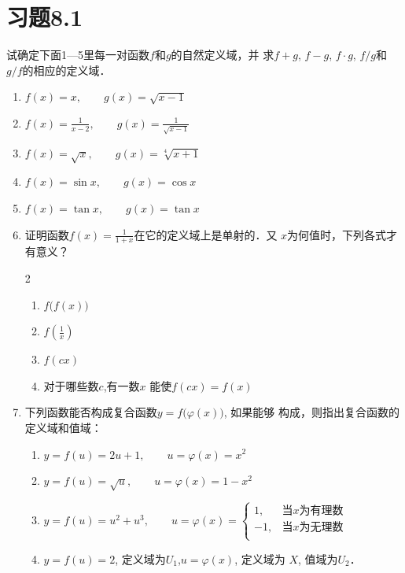 \section*{习题8.1}

试确定下面1---5里每一对函数$f$和$g$的自然定义域，并
求$f+g$, $f-g$, $f\cdot g$, $f/g$和$g/f$的相应的定义域．

\begin{enumerate}
    \item $f(x)=x,\qquad g(x)=\sqrt{x-1}$
    \item $f(x)=\frac{1}{x-2},\qquad g(x)=\frac{1}{\sqrt{x-1}}$
        \item $f(x)=\sqrt{x},\qquad g(x)=\sqrt[4]{x+1}$
    \item $f(x)=\sin x,\qquad g(x)=\cos x$
    \item $f(x)=\tan x,\qquad g(x)=\tan x$
    \item 证明函数$f(x)=\frac{1}{1+x}$在它的定义域上是单射的．又
    $x$为何值时，下列各式才有意义？
    \begin{multicols}{2}
\begin{enumerate}
    \item $f\big(f(x)\big)$
    \item $f\left(\frac{1}{x}\right)$
    \item $f(cx)$
    \item 对于哪些数$c$,有一数$x$
    能使$f(cx)=f(x)$
\end{enumerate}        
    \end{multicols}

\item 下列函数能否构成复合函数$y=f\big(\varphi(x)\big)$, 如果能够
构成，则指出复合函数的定义域和值域：
\begin{enumerate}
    \item $y=f(u)=2u+1,\qquad u=\varphi(x)=x^2$
    \item $y=f(u)=\sqrt{u},\qquad u=\varphi(x)=1-x^2$
    \item $y=f(u)=u^2+u^3, \qquad u=\varphi(x)=\begin{cases}
        1,& \text{当$x$为有理数}\\
        -1,&\text{当$x$为无理数}\\
    \end{cases}$
    \item $y=f(u)=2$, 定义域为$U_1$,\qquad  $u=\varphi(x)$, 定义域为
    $X$, 值域为$U_2$．
\end{enumerate}


\end{enumerate}
